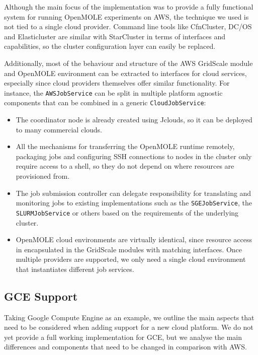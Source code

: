 Although the main focus of the implementation was to provide a fully functional system for running OpenMOLE experiments on AWS, the technique we used is not tied to a single cloud provider. Command line tools like CfnCluster, DC/OS and Elasticluster are similar with StarCluster in terms of interfaces and capabilities, so the cluster configuration layer can easily be replaced.

Additionally, most of the behaviour and structure of the AWS GridScale module and OpenMOLE environment can be extracted to interfaces for cloud services, especially since cloud providers themselves offer similar functionality. For instance, the \verb|AWSJobService| can be split in multiple platform agnostic components that can be combined in a generic \verb|CloudJobService|:

\begin{itemize}
	\item The coordinator node is already created using Jclouds, so it can be deployed to many commercial clouds.
	\item All the mechanisms for transferring the OpenMOLE runtime remotely, packaging jobs and configuring SSH connections to nodes in the cluster only require access to a shell, so they do not depend on where resources are provisioned from.
	\item The job submission controller can delegate responsibility for translating and monitoring jobs to existing implementations such as the \verb|SGEJobService|, the \verb|SLURMJobService| or others based on the requirements of the underlying cluster.
	\item OpenMOLE cloud environments are virtually identical, since resource access in encapsulated in the GridScale modules with matching interfaces. Once multiple providers are supported, we only need a single cloud environment that instantiates different job services.
\end{itemize}

\vspace{-1mm}
\subsection{GCE Support}

Taking Google Compute Engine as an example, we outline the main aspects that need to be considered when adding support for a new cloud platform. We do not yet provide a full working implementation for GCE, but we analyse the main differences and components that need to be changed in comparison with AWS.

